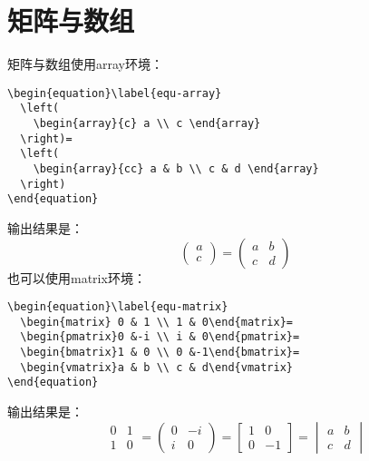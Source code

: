 \section{矩阵与数组}
矩阵与数组使用array环境：
\begin{verbatim}
\begin{equation}\label{equ-array}
  \left(
    \begin{array}{c} a \\ c \end{array}
  \right)=
  \left(
    \begin{array}{cc} a & b \\ c & d \end{array}
  \right)
\end{equation}
\end{verbatim}
输出结果是：
\begin{equation}\label{equ-array}
  \left(
  \begin{array}{c} a \\ c \end{array}
  \right)=
  \left(
  \begin{array}{cc} a & b \\ c & d \end{array}
  \right)
\end{equation}
也可以使用matrix环境：
\begin{verbatim}
\begin{equation}\label{equ-matrix}
  \begin{matrix} 0 & 1 \\ 1 & 0\end{matrix}=
  \begin{pmatrix}0 &-i \\ i & 0\end{pmatrix}=
  \begin{bmatrix}1 & 0 \\ 0 &-1\end{bmatrix}=
  \begin{vmatrix}a & b \\ c & d\end{vmatrix}
\end{equation}
\end{verbatim}
输出结果是：
\begin{equation}\label{equ-matrix}
  \begin{matrix} 0 & 1 \\ 1 & 0\end{matrix}=
  \begin{pmatrix}0 &-i \\ i & 0\end{pmatrix}=
  \begin{bmatrix}1 & 0 \\ 0 &-1\end{bmatrix}=
  \begin{vmatrix}a & b \\ c & d\end{vmatrix}
\end{equation}

